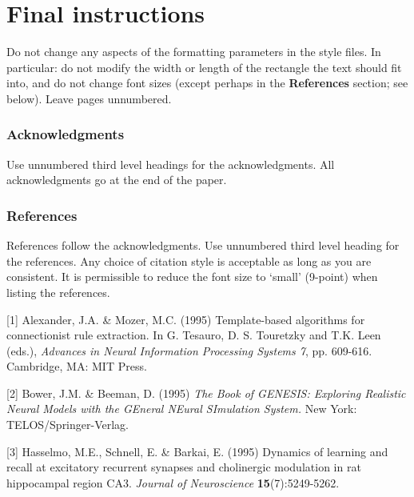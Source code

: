 \documentclass{article}
\begin{document}
\section{Final instructions}
Do not change any aspects of the formatting parameters in the style files. In
particular: do not modify the width or length of the rectangle the text should
fit into, and do not change font sizes (except perhaps in the
\textbf{References} section; see below). Leave pages unnumbered.

\subsubsection*{Acknowledgments}

Use unnumbered third level headings for the acknowledgments. All
acknowledgments go at the end of the paper.

\subsubsection*{References}

References follow the acknowledgments. Use unnumbered third level heading for
the references. Any choice of citation style is acceptable as long as you are
consistent. It is permissible to reduce the font size to `small' (9-point) 
when listing the references.

\small{
[1] Alexander, J.A. \& Mozer, M.C. (1995) Template-based algorithms
for connectionist rule extraction. In G. Tesauro, D. S. Touretzky
and T.K. Leen (eds.), {\it Advances in Neural Information Processing
Systems 7}, pp. 609-616. Cambridge, MA: MIT Press.

[2] Bower, J.M. \& Beeman, D. (1995) {\it The Book of GENESIS: Exploring
Realistic Neural Models with the GEneral NEural SImulation System.}
New York: TELOS/Springer-Verlag.

[3] Hasselmo, M.E., Schnell, E. \& Barkai, E. (1995) Dynamics of learning
and recall at excitatory recurrent synapses and cholinergic modulation
in rat hippocampal region CA3. {\it Journal of Neuroscience}
{\bf 15}(7):5249-5262.
}
\end{document}
